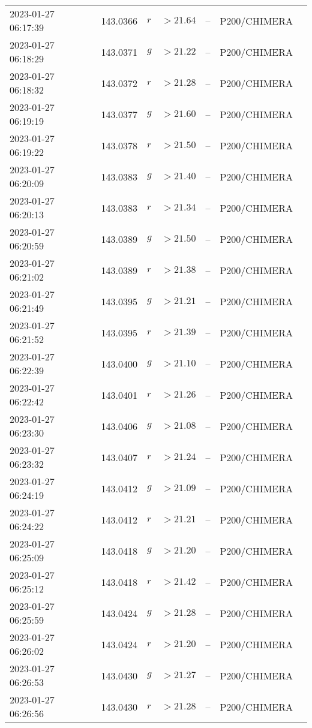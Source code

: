 \documentclass{nature_plusfigure}
\begin{document}
\begin{supplement}
\begin{center}
\begin{longtable}{lllllll}
2023-01-27 06:17:39 & 143.0366 & $r$ & $>21.64$ & -- & P200/CHIMERA &  \\ 
2023-01-27 06:18:29 & 143.0371 & $g$ & $>21.22$ & -- & P200/CHIMERA &  \\ 
2023-01-27 06:18:32 & 143.0372 & $r$ & $>21.28$ & -- & P200/CHIMERA &  \\ 
2023-01-27 06:19:19 & 143.0377 & $g$ & $>21.60$ & -- & P200/CHIMERA &  \\ 
2023-01-27 06:19:22 & 143.0378 & $r$ & $>21.50$ & -- & P200/CHIMERA &  \\ 
2023-01-27 06:20:09 & 143.0383 & $g$ & $>21.40$ & -- & P200/CHIMERA &  \\ 
2023-01-27 06:20:13 & 143.0383 & $r$ & $>21.34$ & -- & P200/CHIMERA &  \\ 
2023-01-27 06:20:59 & 143.0389 & $g$ & $>21.50$ & -- & P200/CHIMERA &  \\ 
2023-01-27 06:21:02 & 143.0389 & $r$ & $>21.38$ & -- & P200/CHIMERA &  \\ 
2023-01-27 06:21:49 & 143.0395 & $g$ & $>21.21$ & -- & P200/CHIMERA &  \\ 
2023-01-27 06:21:52 & 143.0395 & $r$ & $>21.39$ & -- & P200/CHIMERA &  \\ 
2023-01-27 06:22:39 & 143.0400 & $g$ & $>21.10$ & -- & P200/CHIMERA &  \\ 
2023-01-27 06:22:42 & 143.0401 & $r$ & $>21.26$ & -- & P200/CHIMERA &  \\ 
2023-01-27 06:23:30 & 143.0406 & $g$ & $>21.08$ & -- & P200/CHIMERA &  \\ 
2023-01-27 06:23:32 & 143.0407 & $r$ & $>21.24$ & -- & P200/CHIMERA &  \\ 
2023-01-27 06:24:19 & 143.0412 & $g$ & $>21.09$ & -- & P200/CHIMERA &  \\ 
2023-01-27 06:24:22 & 143.0412 & $r$ & $>21.21$ & -- & P200/CHIMERA &  \\ 
2023-01-27 06:25:09 & 143.0418 & $g$ & $>21.20$ & -- & P200/CHIMERA &  \\ 
2023-01-27 06:25:12 & 143.0418 & $r$ & $>21.42$ & -- & P200/CHIMERA &  \\ 
2023-01-27 06:25:59 & 143.0424 & $g$ & $>21.28$ & -- & P200/CHIMERA &  \\ 
2023-01-27 06:26:02 & 143.0424 & $r$ & $>21.20$ & -- & P200/CHIMERA &  \\ 
2023-01-27 06:26:53 & 143.0430 & $g$ & $>21.27$ & -- & P200/CHIMERA &  \\ 
2023-01-27 06:26:56 & 143.0430 & $r$ & $>21.28$ & -- & P200/CHIMERA &  \\ 

\end{longtable}
\end{center}
\end{supplement}
\end{document}
